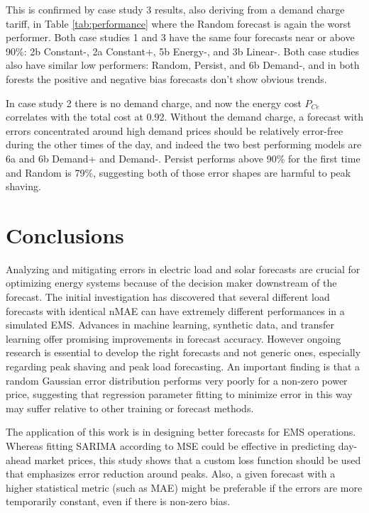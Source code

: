 \documentclass[conference]{IEEEtran}
\begin{document}
This is confirmed by case study 3 results, also deriving from a demand charge tariff, in Table \ref{tab:performance} where the Random forecast is again the worst performer. Both case studies 1 and 3 have the same four forecasts near or above 90\%: 2b Constant-, 2a Constant+, 5b Energy-, and 3b Linear-. Both case studies also have similar low performers: Random, Persist, and 6b Demand-, and in both forests the positive and negative bias forecasts don't show obvious trends.

In case study 2 there is no demand charge, and now the energy cost $P_{Ce}$ correlates with the total cost at 0.92. Without the demand charge, a forecast with errors concentrated around high demand prices should be relatively error-free during the other times of the day, and indeed the two best performing models are 6a and 6b Demand+ and Demand-. Persist performs above 90\% for the first time and Random is 79\%, suggesting both of those error shapes are harmful to peak shaving.


\section{Conclusions}

Analyzing and mitigating errors in electric load and solar forecasts are crucial for optimizing energy systems because of the decision maker downstream of the forecast. The initial investigation has discovered that several different load forecasts with identical nMAE can have extremely different performances in a simulated EMS. Advances in machine learning, synthetic data, and transfer learning offer promising improvements in forecast accuracy. However ongoing research is essential to develop the right forecasts and not generic ones, especially regarding peak shaving and peak load forecasting. An important finding is that a random Gaussian error distribution performs very poorly for a non-zero power price, suggesting that regression parameter fitting to minimize error in this way may suffer relative to other training or forecast methods.

The application of this work is in designing better forecasts for EMS operations. Whereas fitting SARIMA according to MSE could be effective in predicting day-ahead market prices, this study shows that a custom loss function should be used that emphasizes error reduction around peaks. Also, a given forecast with a higher statistical metric (such as MAE) might be preferable if the errors are more temporarily constant, even if there is non-zero bias. 
\end{document}

